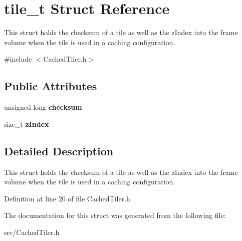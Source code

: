 \hypertarget{structtile__t}{
\section{tile\_\-t Struct Reference}
\label{structtile__t}
}


This struct holds the checksum of a tile as well as the zIndex into the frame volume when the tile is used in a caching configuration.  




{\ttfamily \#include $<$CachedTiler.h$>$}

\subsection*{Public Attributes}
\begin{DoxyCompactItemize}
\item 
\hypertarget{structtile__t_a9691cd62b694e07412978c45991dd624}{
unsigned long {\bfseries checksum}}
\label{structtile__t_a9691cd62b694e07412978c45991dd624}

\item 
\hypertarget{structtile__t_a9d51f2af19eb753f70f16c794c424288}{
size\_\-t {\bfseries zIndex}}
\label{structtile__t_a9d51f2af19eb753f70f16c794c424288}

\end{DoxyCompactItemize}


\subsection{Detailed Description}
This struct holds the checksum of a tile as well as the zIndex into the frame volume when the tile is used in a caching configuration. 

Definition at line 20 of file CachedTiler.h.



The documentation for this struct was generated from the following file:\begin{DoxyCompactItemize}
\item 
src/CachedTiler.h\end{DoxyCompactItemize}
